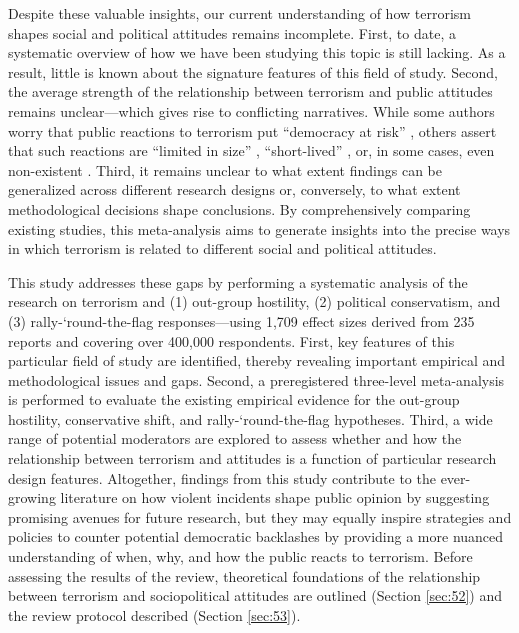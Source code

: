 Despite these valuable insights, our current understanding of how terrorism shapes social and political attitudes remains incomplete. First, to date, a systematic overview of how we have been studying this topic is still lacking. As a result, little is known about the signature features of this field of study. Second, the average strength of the relationship between terrorism and public attitudes remains unclear---which gives rise to conflicting narratives. While some authors worry that public reactions to terrorism put ``democracy at risk'' \citep{Merolla2009a}, others assert that such reactions are ``limited in size'' \citep{Sniderman2019a}, ``short-lived'' \citep{Arvanitidis2016}, or, in some cases, even non-existent \citep{Castanhosilva2018, Larsen2020}. Third, it remains unclear to what extent findings can be generalized across different research designs or, conversely, to what extent methodological decisions shape conclusions. By comprehensively comparing existing studies, this meta-analysis aims to generate insights into the precise ways in which terrorism is related to different social and political attitudes.


This study addresses these gaps by performing a systematic analysis of the research on terrorism and (1) out-group hostility, (2) political conservatism, and (3) rally-‘round-the-flag responses---using 1,709 effect sizes derived from 235 reports and covering over 400,000 respondents. First, key features of this particular field of study are identified, thereby revealing important empirical and methodological issues and gaps. Second, a preregistered three-level meta-analysis is performed to evaluate the existing empirical evidence for the out-group hostility, conservative shift, and rally-‘round-the-flag hypotheses. Third, a wide range of potential moderators are explored to assess whether and how the relationship between terrorism and attitudes is a function of particular research design features. Altogether, findings from this study contribute to the ever-growing literature on how violent incidents shape public opinion by suggesting promising avenues for future research, but they may equally inspire strategies and policies to counter potential democratic backlashes by providing a more nuanced understanding of when, why, and how the public reacts to terrorism. Before assessing the results of the review, theoretical foundations of the relationship between terrorism and sociopolitical attitudes are outlined (Section \ref{sec:52}) and the review protocol described (Section \ref{sec:53}).


